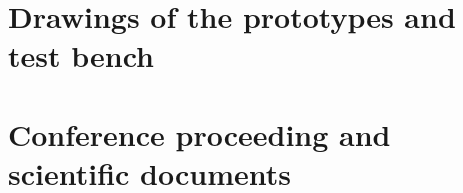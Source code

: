 \chapter{Drawings of the prototypes and test bench}









\chapter{Conference proceeding and scientific documents}



